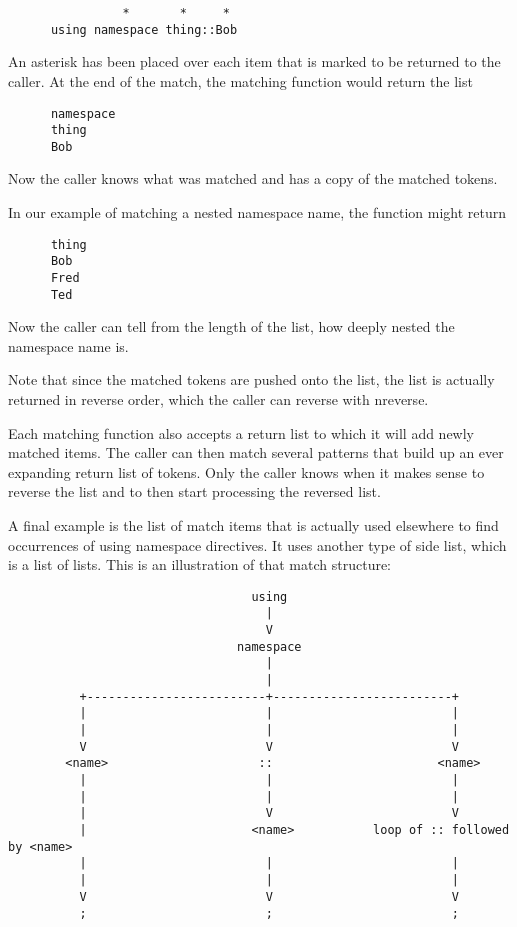 \small{\begin{verbatim}
                *       *     *
      using namespace thing::Bob
\end{verbatim}}

An asterisk has been placed over each item that is marked to be returned to
the caller.  At the end of the match, the matching function would return the
list

\small{\begin{verbatim}
      namespace
      thing
      Bob
\end{verbatim}}

Now the caller knows what was matched and has a copy of the matched tokens.

In our example of matching a nested namespace name, the function might return

\small{\begin{verbatim}
      thing
      Bob
      Fred
      Ted
\end{verbatim}}

Now the caller can tell from the length of the list, how deeply nested the
namespace name is.

Note that since the matched tokens are pushed onto the list, the list is
actually returned in reverse order, which the caller can reverse with
nreverse.

Each matching function also accepts a return list to which it will add newly
matched items.  The caller can then match several patterns that build up an
ever expanding return list of tokens.  Only the caller knows when it makes
sense to reverse the list and to then start processing the reversed list.

A final example is the list of match items that is actually used elsewhere to
find occurrences of using namespace directives.  It uses another type of side
list, which is a list of lists.  This is an illustration of that match
structure:



\small{\begin{verbatim}
                                  using
                                    |
                                    V
                                namespace
                                    |
                                    |
          +-------------------------+-------------------------+
          |                         |                         |
          |                         |                         |
          V                         V                         V
        <name>                     ::                       <name>
          |                         |                         |
          |                         |                         |
          |                         V                         V
          |                       <name>           loop of :: followed by <name>
          |                         |                         |
          |                         |                         |
          V                         V                         V
          ;                         ;                         ;
\end{verbatim}}

